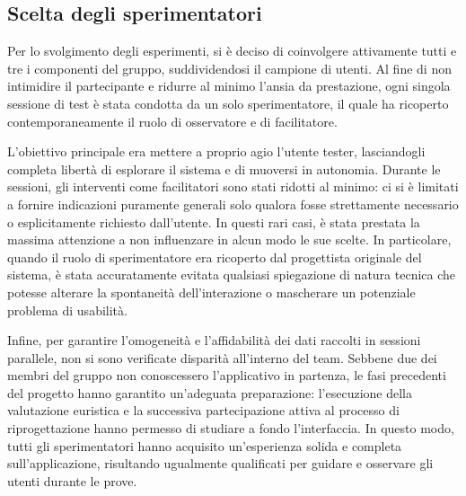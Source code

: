\subsection{Scelta degli sperimentatori}
Per lo svolgimento degli esperimenti, si è deciso di coinvolgere attivamente tutti e tre i componenti del gruppo, suddividendosi il campione di utenti. Al fine di non intimidire il partecipante e ridurre al minimo l'ansia da prestazione, ogni singola sessione di test è stata condotta da un solo sperimentatore, il quale ha ricoperto contemporaneamente il ruolo di osservatore e di facilitatore. 

L'obiettivo principale era mettere a proprio agio l'utente tester, lasciandogli completa libertà di esplorare il sistema e di muoversi in autonomia. Durante le sessioni, gli interventi come facilitatori sono stati ridotti al minimo: ci si è limitati a fornire indicazioni puramente generali solo qualora fosse strettamente necessario o esplicitamente richiesto dall'utente. In questi rari casi, è stata prestata la massima attenzione a non influenzare in alcun modo le sue scelte. In particolare, quando il ruolo di sperimentatore era ricoperto dal progettista originale del sistema, è stata accuratamente evitata qualsiasi spiegazione di natura tecnica che potesse alterare la spontaneità dell'interazione o mascherare un potenziale problema di usabilità. 

Infine, per garantire l'omogeneità e l'affidabilità dei dati raccolti in sessioni parallele, non si sono verificate disparità all'interno del team. Sebbene due dei membri del gruppo non conoscessero l'applicativo in partenza, le fasi precedenti del progetto hanno garantito un'adeguata preparazione: l'esecuzione della valutazione euristica e la successiva partecipazione attiva al processo di riprogettazione hanno permesso di studiare a fondo l'interfaccia. In questo modo, tutti gli sperimentatori hanno acquisito un'esperienza solida e completa sull'applicazione, risultando ugualmente qualificati per guidare e osservare gli utenti durante le prove.